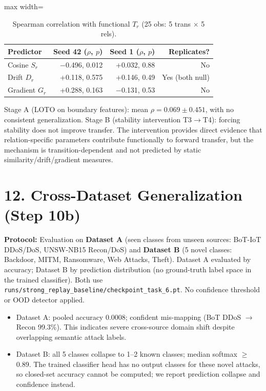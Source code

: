 \documentclass[11pt,a4paper]{article}
\begin{document}
\begin{table}[H]
\centering
\caption{Spearman correlation with functional $T_r$ (25 obs: 5 trans $\times$ 5 rels).}
\label{tab:predictor-correlations}
\begin{adjustbox}{max width=\textwidth}
\begin{tabular}{lrrr}
\toprule
Predictor & Seed 42 ($\rho$, $p$) & Seed 1 ($\rho$, $p$) & Replicates? \\
\midrule
Cosine $S_r$ & \num{-0.496}, \num{0.012} & +\num{0.032}, \num{0.88} & No \\
Drift $D_r$ & +\num{0.118}, \num{0.575} & +\num{0.146}, \num{0.49} & Yes (both null) \\
Gradient $G_r$ & +\num{0.288}, \num{0.163} & \num{-0.131}, \num{0.53} & No \\
\bottomrule
\end{tabular}
\end{adjustbox}
\end{table}

Stage A (LOTO on boundary features): mean $\rho=\num{0.069}\pm\num{0.451}$, with no consistent generalization. Stage B (stability intervention T3$\to$T4): forcing stability does not improve transfer. The intervention provides direct evidence that relation-specific parameters contribute functionally to forward transfer, but the mechanism is transition-dependent and not predicted by static similarity/drift/gradient measures.

\section*{12. Cross-Dataset Generalization (Step 10b)}
\begin{sloppypar}
\textbf{Protocol:} Evaluation on \textbf{Dataset A} (seen classes from unseen sources: BoT-IoT DDoS/DoS, UNSW-NB15 Recon/DoS) and \textbf{Dataset B} (5 novel classes: Backdoor, MITM, Ransomware, Web Attacks, Theft). Dataset A evaluated by accuracy; Dataset B by prediction distribution (no ground-truth label space in the trained classifier). Both use \texttt{runs/strong\_replay\_baseline/checkpoint\_task\_6.pt}. No confidence threshold or OOD detector applied.
\end{sloppypar}

\begin{itemize}[leftmargin=*]
\item Dataset A: pooled accuracy \num{0.0008}; confident mis-mapping (BoT DDoS $\to$ Recon \num{99.3}\%). This indicates severe cross-source domain shift despite overlapping semantic attack labels.
\item Dataset B: all 5 classes collapse to 1--2 known classes; median softmax $\ge$\num{0.89}. The trained classifier head has no output classes for these novel attacks, so closed-set accuracy cannot be computed; we report prediction collapse and confidence instead.
\end{itemize}
\end{document}
